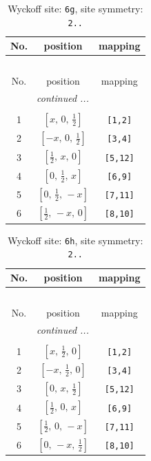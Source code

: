 \documentclass[fleqn,8pt]{jsarticle}
\begin{document}
\renewcommand{\arraystretch}{1.2}
\begin{longtable}{ccc}
\caption{Wyckoff site: {\tt 6g}, site symmetry: {\tt 2..}}
 \\
 \hline \hline
No. & position & mapping \\ \hline \endfirsthead

\multicolumn{2}{l}{\tablename\ \thetable{}} \\
 \hline \hline
No. & position & mapping \\ \hline \endhead

 \hline \hline
\multicolumn{2}{r}{\footnotesize\it continued ...} \\ \endfoot

 \hline \hline
\multicolumn{2}{r}{} \\ \endlastfoot

1 & $\left[ x,\, 0,\, \frac{1}{2} \right]$ & {\tt [1,2]} \\ \hline
2 & $\left[ - x,\, 0,\, \frac{1}{2} \right]$ & {\tt [3,4]} \\ \hline
3 & $\left[ \frac{1}{2},\, x,\, 0 \right]$ & {\tt [5,12]} \\ \hline
4 & $\left[ 0,\, \frac{1}{2},\, x \right]$ & {\tt [6,9]} \\ \hline
5 & $\left[ 0,\, \frac{1}{2},\, - x \right]$ & {\tt [7,11]} \\ \hline
6 & $\left[ \frac{1}{2},\, - x,\, 0 \right]$ & {\tt [8,10]} \\
\end{longtable}
\renewcommand{\arraystretch}{1.2}
\begin{longtable}{ccc}
\caption{Wyckoff site: {\tt 6h}, site symmetry: {\tt 2..}}
 \\
 \hline \hline
No. & position & mapping \\ \hline \endfirsthead

\multicolumn{2}{l}{\tablename\ \thetable{}} \\
 \hline \hline
No. & position & mapping \\ \hline \endhead

 \hline \hline
\multicolumn{2}{r}{\footnotesize\it continued ...} \\ \endfoot

 \hline \hline
\multicolumn{2}{r}{} \\ \endlastfoot

1 & $\left[ x,\, \frac{1}{2},\, 0 \right]$ & {\tt [1,2]} \\ \hline
2 & $\left[ - x,\, \frac{1}{2},\, 0 \right]$ & {\tt [3,4]} \\ \hline
3 & $\left[ 0,\, x,\, \frac{1}{2} \right]$ & {\tt [5,12]} \\ \hline
4 & $\left[ \frac{1}{2},\, 0,\, x \right]$ & {\tt [6,9]} \\ \hline
5 & $\left[ \frac{1}{2},\, 0,\, - x \right]$ & {\tt [7,11]} \\ \hline
6 & $\left[ 0,\, - x,\, \frac{1}{2} \right]$ & {\tt [8,10]} \\
\end{longtable}
\end{document}

